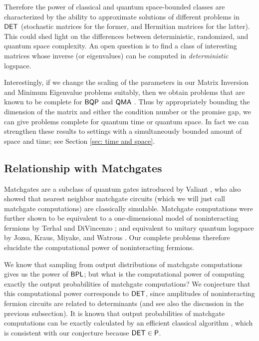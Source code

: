 \documentclass[11pt]{article}
\theoremstyle{definition}
\theoremstyle{remark}
\newcommand\DET{{\sf{DET}}}
\newcommand\QMA{{\sf{QMA}}}
\newcommand\BQP{{\sf{BQP}}}
\newcommand\BPL{{\sf{BPL}}}
\newcommand{\classfont}{\sf}
\begin{document}
Therefore the power of classical and quantum space-bounded classes are characterized by the ability to approximate solutions of different problems in $\DET$ (stochastic matrices for the former, and Hermitian matrices for the latter). This could shed light on the differences between deterministic, randomized, and quantum space complexity. An open question is to find a class of interesting matrices whose inverse (or eigenvalues) can be computed in \emph{deterministic} logspace.

Interestingly, if we change the scaling of the parameters in our Matrix Inversion and Minimum Eigenvalue problems suitably, then we obtain problems that are known to be complete for $\BQP$ \cite{HHL} and $\QMA$ \cite{ksv02,at03}.
Thus by appropriately bounding the dimension of the matrix and either the condition number or the promise gap, we can give problems complete for quantum time or quantum space. In fact we can strengthen these results to settings with a simultaneously bounded amount of space and time; see Section \ref{sec: time and space}. 
\subsection{Relationship with Matchgates} \label{sec: matchgates}

Matchgates are a subclass of quantum gates introduced by Valiant \cite{Val02SIComp}, who also showed that nearest neighbor matchgate circuits (which we will just call matchgate computations) are classically simulable. Matchgate computations were further shown to be equivalent to a one-dimensional model of noninteracting fermions by Terhal and DiVincenzo \cite{TerDiV02PRA}; and equivalent to unitary quantum logspace by Jozsa, Kraus, Miyake, and Watrous \cite{JozKraMiyWat10RSPA}. Our complete problems therefore elucidate the computational power of noninteracting fermions.

We know that sampling from output distributions of matchgate computations gives us the power of $\BPL$; but what is the computational power of computing exactly the output probabilities of matchgate computations? We conjecture that this computational power corresponds to $\DET$, since amplitudes of noninteracting fermion circuits are related to determinants (and see also the discussion in the previous subsection). It is known that output probabilities of matchgate computations can be exactly calculated by an efficient classical algorithm \cite{JozMiy08RSPA}, which is consistent with our conjecture because $\DET \in \classfont{P}$.
\end{document}
